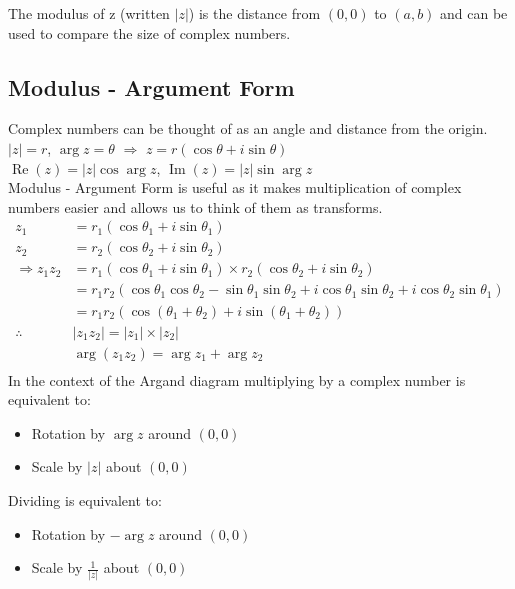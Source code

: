 \documentclass[a4paper,12pt]{article}
\begin{document}
The modulus of z (written $|z|$) is the distance from $(0,0)$ to $(a,b)$ and can be used to compare the size of complex numbers. \\

\subsection*{Modulus - Argument Form}
Complex numbers can be thought of as an angle and distance from the origin. \\
$|z| = r$, $\arg z = \theta$ $\Rightarrow$ $z = r(\cos \theta + i \sin \theta)$ \\
$\operatorname{Re}(z) = |z| \cos \arg z$, $\operatorname{Im}(z) = |z| \sin \arg z$ \\
Modulus - Argument Form is useful as it makes multiplication of complex numbers easier and allows us to think of them as transforms. \\
\begin{align*}
z_1 & = r_1(\cos \theta_1 + i \sin \theta_1) \\
z_2 & = r_2(\cos \theta_2 + i \sin \theta_2) \\
\Rightarrow z_1 z_2 & = r_1(\cos \theta_1 + i \sin \theta_1) \times r_2(\cos \theta_2 + i \sin \theta_2) \\
& = r_1 r_2(\cos \theta_1 \cos \theta_2 - \sin \theta_1 \sin \theta_2 + i \cos \theta_1 \sin \theta_2 + i \cos \theta_2 \sin \theta_1) \\
& = r_1 r_2(\cos(\theta_1 + \theta_2) + i \sin(\theta_1 + \theta_2)) \\
\therefore & |z_1 z_2| = |z_1| \times |z_2| \\
& \arg(z_1 z_2) = \arg z_1 + \arg z_2 \\
\end{align*}
In the context of the Argand diagram multiplying by a complex number is equivalent to:
\begin{itemize}
	\item Rotation by $\arg z$ around $(0,0)$
	\item Scale by $|z|$ about $(0,0)$
\end{itemize} 
Dividing is equivalent to:
\begin{itemize}
	\item Rotation by $- \arg z$ around $(0,0)$
	\item Scale by $\frac{1}{|z|}$ about $(0,0)$
\end{itemize} 
\end{document}
